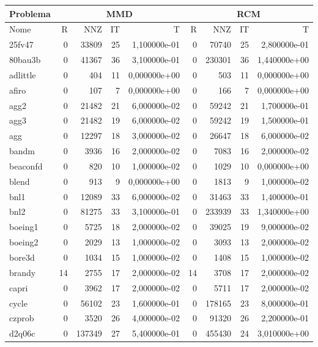 \begin{tabular}{|l|r|r|r|r|r|r|r|r|}
\hline
\multicolumn{1}{|c|}{Problema} & \multicolumn{4}{|c|}{MMD} &         \multicolumn{4}{|c|}{RCM} \\ \hline
Nome & R & NNZ & IT & T & R & NNZ & IT & T \\ \hline
25fv47 & 0 & 33809 & 25 & 1,100000e-01 & 0 & 70740 & 25 & 2,800000e-01 \\ \hline
80bau3b & 0 & 41367 & 36 & 3,100000e-01 & 0 & 230301 & 36 & 1,440000e+00 \\ \hline
adlittle & 0 & 404 & 11 & 0,000000e+00 & 0 & 503 & 11 & 0,000000e+00 \\ \hline
afiro & 0 & 107 & 7 & 0,000000e+00 & 0 & 166 & 7 & 0,000000e+00 \\ \hline
agg2 & 0 & 21482 & 21 & 6,000000e-02 & 0 & 59242 & 21 & 1,700000e-01 \\ \hline
agg3 & 0 & 21482 & 19 & 6,000000e-02 & 0 & 59242 & 19 & 1,500000e-01 \\ \hline
agg & 0 & 12297 & 18 & 3,000000e-02 & 0 & 26647 & 18 & 6,000000e-02 \\ \hline
bandm & 0 & 3936 & 16 & 2,000000e-02 & 0 & 7083 & 16 & 2,000000e-02 \\ \hline
beaconfd & 0 & 820 & 10 & 1,000000e-02 & 0 & 1029 & 10 & 0,000000e+00 \\ \hline
blend & 0 & 913 & 9 & 0,000000e+00 & 0 & 1813 & 9 & 1,000000e-02 \\ \hline
bnl1 & 0 & 12089 & 33 & 6,000000e-02 & 0 & 31463 & 33 & 1,400000e-01 \\ \hline
bnl2 & 0 & 81275 & 33 & 3,100000e-01 & 0 & 233939 & 33 & 1,340000e+00 \\ \hline
boeing1 & 0 & 5725 & 18 & 2,000000e-02 & 0 & 39025 & 19 & 9,000000e-02 \\ \hline
boeing2 & 0 & 2029 & 13 & 1,000000e-02 & 0 & 3093 & 13 & 2,000000e-02 \\ \hline
bore3d & 0 & 1034 & 15 & 1,000000e-02 & 0 & 1408 & 15 & 1,000000e-02 \\ \hline
brandy & 14 & 2755 & 17 & 2,000000e-02 & 14 & 3708 & 17 & 2,000000e-02 \\ \hline
capri & 0 & 3962 & 17 & 2,000000e-02 & 0 & 5711 & 17 & 2,000000e-02 \\ \hline
cycle & 0 & 56102 & 23 & 1,600000e-01 & 0 & 178165 & 23 & 8,000000e-01 \\ \hline
czprob & 0 & 3520 & 26 & 4,000000e-02 & 0 & 91320 & 26 & 2,200000e-01 \\ \hline
d2q06c & 0 & 137349 & 27 & 5,400000e-01 & 0 & 455430 & 24 & 3,010000e+00 \\ \hline

\end{tabular}
